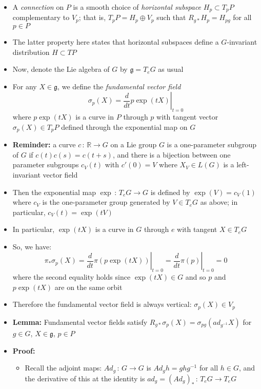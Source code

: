 \documentclass[12pt,a4paper]{article}
\numberwithin{equation}{section}
\begin{document}
\begin{itemize}
		\item A \textit{connection} on $P$ is a smooth choice of \textit{horizontal subspace} $H_{p}\subset T_{p}P$ complementary to $V_{p}$; that is, $T_{p}P=H_{p}\oplus V_{p}$ such that $R_{g*}H_{p}=H_{pg}$ for all $p\in P$
		\item The latter property here states that horizontal subspaces define a $G$-invariant distribution $H\subset TP$
		\item Now, denote the Lie algebra of $G$ by $\mathfrak{g}=T_{e}G$ as usual
		\item For any $X\in\mathfrak{g}$, we define the \textit{fundamental vector field}
		\begin{equation}
			\sigma_{p}(X)=\left.\frac{d}{dt}p\exp(tX)\right\rvert_{t=0}
		\end{equation}
		where $p\exp(tX)$ is a curve in $P$ through $p$ with tangent vector $\sigma_{p}(X)\in T_{p}P$ defined through the exponential map on $G$
		\item \textbf{Reminder:} a curve $c\,:\,\mathbb{R}\to G$ on a Lie group $G$ is a one-parameter subgroup of $G$ if $c(t)c(s)=c(t+s)$, and there is a bijection between one parameter subgroups $c_{V}(t)$ with $c'(0)=V$ where $X_{V}\in L(G)$ is a left-invariant vector field
		\item Then the exponential map $\exp\,:\,T_{e}G\to G$ is defined by $\exp(V)=c_{V}(1)$ where $c_{V}$ is the one-parameter group generated by $V\in T_{e}G$ as above; in particular, $c_{V}(t)=\exp(tV)$
		\item In particular, $\exp(tX)$ is a curve in $G$ through $e$ with tangent $X\in T_{e}G$
		\item So, we have:
		\begin{equation}
			\pi_{*}\sigma_{p}(X)=\left.\frac{d}{dt}\pi(p\exp(tX))\right\rvert_{t=0}=\left.\frac{d}{dt}\pi(p)\right\rvert_{t=0}=0
		\end{equation}
		where the second equality holds since $\exp(tX)\in G$ and so $p$ and $p\exp(tX)$ are on the same orbit
		\item Therefore the fundamental vector field is always vertical: $\sigma_{p}(X)\in V_{p}$
		\item \textbf{Lemma:} Fundamental vector fields satisfy $R_{g*}\sigma_{p}(X)=\sigma_{pg}(ad_{g^{-1}}X)$ for $g\in G$, $X\in\mathfrak{g}$, $p\in P$
		\item \textbf{Proof:}
		\begin{itemize}
			\item Recall the adjoint maps: $Ad_{g}\,:\,G\to G$ is $Ad_{g}h=ghg^{-1}$ for all $h\in G$, and the derivative of this at the identity is $ad_{g}=(Ad_{g})_{*}\,:\,T_{e}G\to T_{e}G$

\end{itemize}
\end{itemize}
\end{document}
